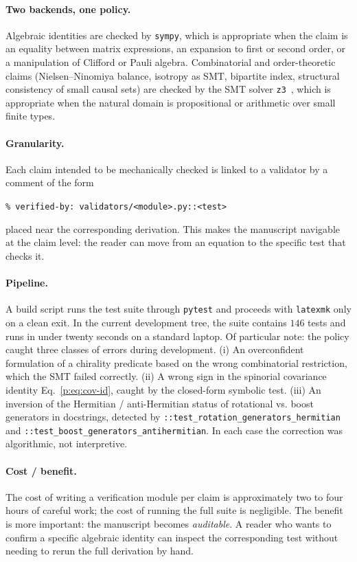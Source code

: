 \documentclass[a4paper,onecolumn,11pt]{quantumarticle}
\begin{document}
\paragraph{Two backends, one policy.}
Algebraic identities are checked by \texttt{sympy}, which is appropriate when the claim is an equality between matrix expressions, an expansion to first or second order, or a manipulation of Clifford or Pauli algebra. Combinatorial and order-theoretic claims (Nielsen--Ninomiya balance, isotropy as SMT, bipartite index, structural consistency of small causal sets) are checked by the SMT solver \texttt{z3}~\cite{deMoura2008}, which is appropriate when the natural domain is propositional or arithmetic over small finite types.

\paragraph{Granularity.}
Each claim intended to be mechanically checked is linked to a validator by a comment of the form
\begin{center}\small\texttt{\% verified-by: validators/\textless module\textgreater.py::\textless test\textgreater}\end{center}
placed near the corresponding derivation. This makes the manuscript navigable at the claim level: the reader can move from an equation to the specific test that checks it.

\paragraph{Pipeline.}
A build script runs the test suite through \texttt{pytest} and proceeds with \texttt{latexmk} only on a clean exit. In the current development tree, the suite contains $146$ tests and runs in under twenty seconds on a standard laptop. Of particular note: the policy caught three classes of errors during development. (i) An overconfident formulation of a chirality predicate based on the wrong combinatorial restriction, which the SMT failed correctly. (ii) A wrong sign in the spinorial covariance identity Eq.~\eqref{p:eq:cov-id}, caught by the closed-form symbolic test. (iii) An inversion of the Hermitian / anti-Hermitian status of rotational vs. boost generators in docstrings, detected by \texttt{::test\_rotation\_generators\_hermitian} and \texttt{::test\_boost\_generators\_antihermitian}. In each case the correction was algorithmic, not interpretive.

\paragraph{Cost / benefit.}
The cost of writing a verification module per claim is approximately two to four hours of careful work; the cost of running the full suite is negligible. The benefit is more important: the manuscript becomes \emph{auditable}. A reader who wants to confirm a specific algebraic identity can inspect the corresponding test without needing to rerun the full derivation by hand.
\end{document}

